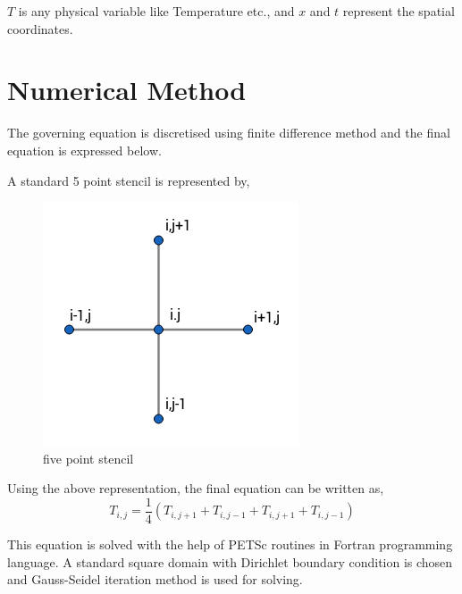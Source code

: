 \hspace{0.25cm}$T$ is any physical variable like Temperature etc., and $x$ and $t$ represent the spatial coordinates.







\section{Numerical Method}
\hspace{0.25cm}The governing equation is discretised using finite difference method and the final equation is expressed below. 

\hspace{0.25cm}A standard 5 point stencil is represented by, 
\begin{figure}[H]
\centering
\includegraphics[scale=0.4]{figures/stencil.png}
\caption{five point stencil}
\label{fig:rline}
\end{figure}
\hspace{0.25cm}Using the above representation, the final equation can be written as,
\begin{equation}
\label{eq:fdm}
         T_{i,j}=\frac{1}{4}(T_{i,j+1}+T_{i,j-1}+T_{i,j+1}+T_{i,j-1}) 
\end{equation}

\hspace{0.25cm}This equation is solved with the help of PETSc routines in Fortran programming language. A standard square domain with Dirichlet boundary condition is chosen and Gauss-Seidel iteration method is used for solving.
    


